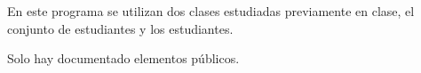 En este programa se utilizan dos clases estudiadas previamente en clase, el conjunto de estudiantes y los estudiantes.

Solo hay documentado elementos públicos. 